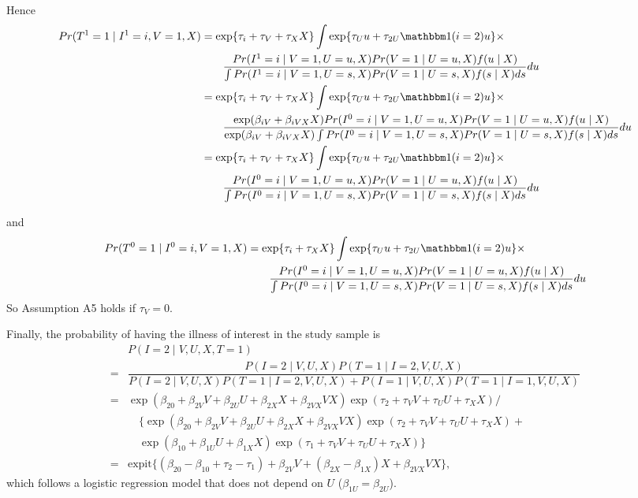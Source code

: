 \documentclass{article}
\def\expit{\mathrm{expit}}
\begin{document}
Hence
\begin{align*}
    Pr(T^1=1\mid I^1=i, V=1, X) &= \exp\{\tau_{i}+\tau_V +  \tau_X X\}\int \exp\{\tau_U u + \tau_{2U}\mathbbm 1(i=2) u \}\times\\
    &\qquad \dfrac{Pr(I^1=i\mid V=1, U=u, X)Pr(V=1\mid U=u, X)f(u\mid X)}{\int Pr(I^1=i\mid V=1, U=s, X)Pr(V=1\mid U=s, X)f(s\mid X) ds}du\\
    &= \exp\{\tau_{i}+\tau_V  +  \tau_X X\}\int \exp\{\tau_U u + \tau_{2U}\mathbbm 1(i=2) u \}\times\\
    &\qquad \dfrac{\exp(\beta_{iV} + \beta_{iVX}X)Pr(I^0=i\mid V=1, U=u, X)Pr(V=1\mid U=u, X)f(u\mid X)}{\exp(\beta_{iV} + \beta_{iVX}X)\int Pr(I^0=i\mid V=1, U=s, X)Pr(V=1\mid U=s, X)f(s\mid X) ds}du\\
    &= \exp\{\tau_{i}+\tau_V + \tau_X X\}\int \exp\{\tau_U u + \tau_{2U}\mathbbm 1(i=2) u \}\times\\
    &\qquad \dfrac{Pr(I^0=i\mid V=1, U=u, X)Pr(V=1\mid U=u, X)f(u\mid X)}{\int Pr(I^0=i\mid V=1, U=s, X)Pr(V=1\mid U=s, X)f(s\mid X) ds}du
\end{align*}

and 
\begin{align*}
    Pr(T^0=1\mid I^0=i, V=1, X) &= \exp\{\tau_{i} +  \tau_X X\}\int \exp\{\tau_U u + \tau_{2U}\mathbbm 1(i=2) u \}\times\\
    &\qquad \dfrac{Pr(I^0=i\mid V=1, U=u, X)Pr(V=1\mid U=u, X)f(u\mid X)}{\int Pr(I^0=i\mid V=1, U=s, X)Pr(V=1\mid U=s, X)f(s\mid X) ds}du
\end{align*}
So Assumption A5 holds if $\tau_V = 0$.


Finally, the probability of having the illness of interest in the study sample is
\begin{align*}
    &P(I=2\mid V, U, X, T=1)\\
    = &\dfrac{P(I=2\mid V, U, X)P(T=1\mid I=2, V, U, X)}{P(I=2\mid V, U, X)P(T=1\mid I=2, V, U, X) + P(I=1\mid V, U, X)P(T=1\mid I=1, V, U, X)}\\
    =& \exp(\beta_{20}+\beta_{2V}V+\beta_{2U}U + \beta_{2X}X + \beta_{2VX}VX)\exp(\tau_2 + \tau_V V + \tau_U U + \tau_X X)/\\
    &\quad \{ \exp(\beta_{20}+\beta_{2V}V+\beta_{2U}U + \beta_{2X}X + \beta_{2VX}VX)\exp(\tau_2 + \tau_V V + \tau_U U + \tau_X X) +\\
    &\quad \exp(\beta_{10}+\beta_{1U}U + \beta_{1X}X)\exp(\tau_1 + \tau_V V + \tau_U U + \tau_X X)\}\\
    =& \expit\{(\beta_{20}-\beta_{10}+\tau_2 - \tau_1) + \beta_{2V}V+(\beta_{2X}-\beta_{1X})X+\beta_{2VX}VX\},
\end{align*}
which follows a logistic regression model that does not depend on $U$ ($\beta_{1U}=\beta_{2U}$).
\end{document}
